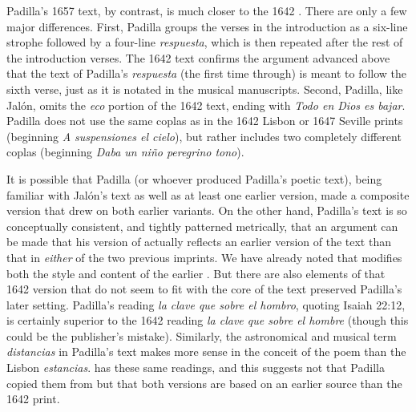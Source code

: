 Padilla's 1657 text, by contrast, is much closer to the 1642 .
There are only a few major differences.
First, Padilla groups the verses in the introduction as a six-line strophe
followed by a four-line \emph{respuesta}, which is then repeated after the rest
of the introduction verses. 
The 1642 text confirms the argument advanced above that the text of Padilla's
\emph{respuesta} (the first time through) is meant to follow the sixth verse,
just as it is notated in the musical manuscripts.
Second, Padilla, like Jalón, omits the \emph{eco} portion of the 1642 text,
ending with \emph{Todo en Dios es bajar}.
Padilla does not use the same coplas as in the 1642 Lisbon or 1647 Seville
prints (beginning \emph{A suspensiones el cielo}), but rather includes two
completely different coplas (beginning \emph{Daba un niño peregrino tono}).

It is possible that Padilla (or whoever produced Padilla's poetic text), being
familiar with Jalón's text as well as at least one earlier version, made a
composite version that drew on both earlier variants.
On the other hand, Padilla's text is so conceptually consistent, and tightly
patterned metrically, that an argument can be made that his version of
 actually reflects an earlier version of the text than that in
\emph{either} of the two previous imprints.
We have already noted that  modifies both the style and content
of the earlier .
But there are also elements of that 1642 version that do not seem to fit with
the core of the text preserved Padilla's later setting.
Padilla's reading \emph{la clave que sobre el hombro}, quoting Isaiah 22:12, is
certainly superior to the 1642 reading \emph{la clave que sobre el hombre}
(though this could be the publisher's mistake).
Similarly, the astronomical and musical term \emph{distancias} in Padilla's text
makes more sense in the conceit of the poem than the Lisbon \emph{estancias}.
 has these same readings, and this suggests not that Padilla
copied them from  but that both versions are based on an
earlier source than the 1642 print.

